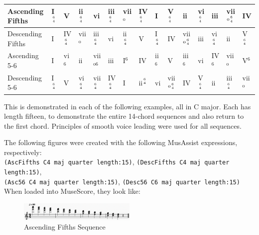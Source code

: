 \documentclass{report}
\begin{document}
\begin{table}[h!]
\begin{tabular}{|l|llllllllllllll|}
\hline
Ascending Fifths  & I$^{6 \atop 4}$ & V                & ii$^{6 \atop 4}$ & vi                & iii$^{6 \atop 4}$ & vii$^\text{o}$   & IV$^{6 \atop 4}$ & I               & V$^{6 \atop 4}$             & ii                          & vi$^{6 \atop 4}$ & iii              & vii$^{\text{o}{6 \atop 4}}$ & IV              \\ \hline
Descending Fifths & I               & IV$^{6 \atop 4}$ & vii$^\text{o}$   & iii$^{6 \atop 4}$ & vi                & ii$^{6 \atop 4}$ & V                & I$^{6 \atop 4}$ & IV                          & vii$^{\text{o}{6 \atop 4}}$ & iii              & vi$^{6 \atop 4}$ & ii                          & V$^{6 \atop 4}$ \\ \hline
Ascending 5-6     & I               & vi$^6$           & ii               & vii$^{\text{o}6}$ & iii               & I$^6$            & IV               & ii$^6$          & V                           & iii$^6$                     & vi               & IV$^6$           & vii$^\text{o}$              & V$^6$           \\ \hline
Descending 5-6    & I$^{6 \atop 4}$ & V                & vi$^{6 \atop 4}$ & vii$^{6 \atop 4}$ & IV$^{6 \atop 4}$  & I                & ii$^{6 \atop 4}$ & vi              & vii$^{\text{o}{6 \atop 4}}$ & IV                          & V$^{6 \atop 4}$  & ii               & iii$^{6 \atop 4}$           & vii$^\text{o}$  \\ \hline
\end{tabular}
\end{table}

This is demonstrated in each of the following examples, all in C major. Each has length fifteen, to demonstrate the entire 14-chord sequences and also return to the first chord. Principles of smooth voice leading were used for all sequences.

The following figures were created with the following MusAssist expressions, respectively: \\\verb.(AscFifths C4 maj quarter length:15)., \verb.(DescFifths C4 maj quarter length:15)., \\\verb.(Asc56 C4 maj quarter length:15)., \verb.(Desc56 C6 maj quarter length:15). When loaded into MuseScore, they look like:

\begin{figure}[h!]
\centering
\includegraphics[width=0.5\textwidth]{images/ascfifths}
  \caption{Ascending Fifths Sequence}
\end{figure}
\end{document}
